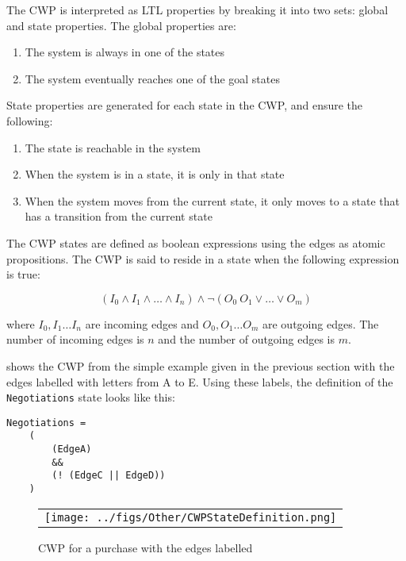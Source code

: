
The CWP is interpreted as LTL properties by breaking it into two sets: global and state properties. The global properties are:
\begin{enumerate}
    \item The system is always in one of the states
    \item The system eventually reaches one of the goal states
\end{enumerate}

State properties are generated for each state in the CWP, and ensure the following:
\begin{enumerate}
    \item The state is reachable in the system
    \item When the system is in a state, it is only in that state
    \item When the system moves from the current state, it only moves to a state that has a transition from the current state
\end{enumerate}

The CWP states are defined as boolean expressions using the edges as atomic propositions. The CWP is said to reside in a state when the following expression is true: 

\[(I_0 \land I_1 \land \ldots \land I_n) \land \neg (O_0 \ O_1 \lor \ldots \lor O_m)\]

where $I_0, I_1 \ldots I_n$ are incoming edges and $O_0, O_1 \ldots O_m$ are outgoing edges. The number of incoming edges is $n$ and the number of outgoing edges is $m$. 

 shows the CWP from the simple example given in the previous section with the edges labelled with letters from A to E. Using these labels, the definition of the \lstinline[style=myPromela]{Negotiations} state looks like this:

\begin{lstlisting}[style=myPromela]
Negotiations =
    (
        (EdgeA)
        &&
        (! (EdgeC || EdgeD))
    )
\end{lstlisting}

\begin{figure*}[t]
  \begin{center}
    \begin{tabular}{c}
        \texttt{[image: ../figs/Other/CWPStateDefinition.png]}
    \end{tabular}
  \end{center}
\caption{CWP for a purchase with the edges labelled}
\label{fig:CWPStateDefinition}
\end{figure*}

